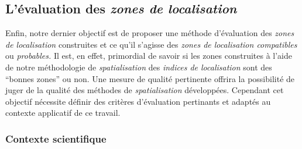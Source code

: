 \subsection{L'évaluation des \emph{zones de localisation}}
\label{subsec:2-1-5}

Enfin, notre dernier objectif est de proposer une méthode d'évaluation
des \emph{zones de localisation} construites et ce qu'il s'agisse des
\emph{zones de localisation compatibles} ou \emph{probables.} Il est,
en effet, primordial de savoir si les zones construites à l'aide de
notre méthodologie de \emph{spatialisation} des \emph{indices de
  localisation} sont des \enquote{bonnes zones} ou non. Une mesure de
qualité pertinente offrira la possibilité de juger de la qualité des
méthodes de \emph{spatialisation} développées. Cependant cet objectif
nécessite définir des critères d'évaluation pertinants et adaptés au
contexte applicatif de ce travail.

\subsubsection{Contexte scientifique}

